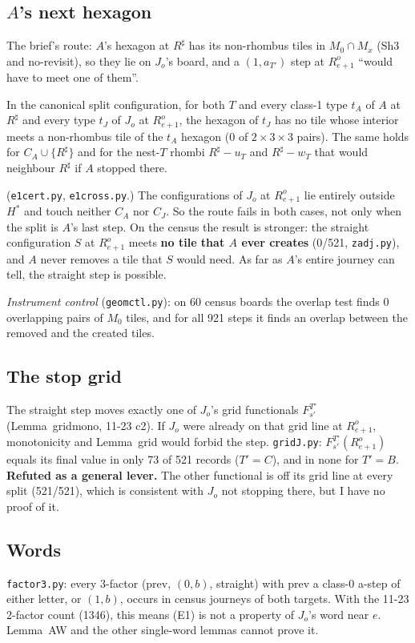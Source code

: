 \documentclass[11pt]{article}
\theoremstyle{definition}\newtheorem{definition}[theorem]{Definition}\newtheorem{remark}[theorem]{Remark}
\begin{document}
\subsection{$A$'s next hexagon}
The brief's route: $A$'s hexagon at $R^\sharp$ has its non-rhombus tiles in $M_0\cap M_x$ (Sh3 and no-revisit), so they lie on $J_o$'s board, and a $(1,a_{T'})$ step at $R^o_{e+1}$ ``would have to meet one of them''.
\begin{lemma}\label{lem:noA}
In the canonical split configuration, for both $T$ and every class-1 type $t_A$ of $A$ at $R^\sharp$ and every type $t_J$ of $J_o$ at $R^o_{e+1}$, the hexagon of $t_J$ has no tile whose interior meets a non-rhombus tile of the $t_A$ hexagon ($0$ of $2\times3\times3$ pairs). The same holds for $C_A\cup\{R^\sharp\}$ and for the nest-$T$ rhombi $R^\sharp-u_T$ and $R^\sharp-w_T$ that would neighbour $R^\sharp$ if $A$ stopped there.
\end{lemma}
\noindent (\texttt{e1cert.py}, \texttt{e1cross.py}.) The configurations of $J_o$ at $R^o_{e+1}$ lie entirely outside $H^\ast$ and touch neither $C_A$ nor $C_J$. So the route fails in both cases, not only when the split is $A$'s last step. On the census the result is stronger: the straight configuration $S$ at $R^o_{e+1}$ meets \textbf{no tile that $A$ ever creates} (0/521, \texttt{zadj.py}), and $A$ never removes a tile that $S$ would need. As far as $A$'s entire journey can tell, the straight step is possible.

\noindent\emph{Instrument control} (\texttt{geomctl.py}): on 60 census boards the overlap test finds 0 overlapping pairs of $M_0$ tiles, and for all 921 steps it finds an overlap between the removed and the created tiles.

\subsection{The stop grid}
The straight step moves exactly one of $J_o$'s grid functionals $F^{T'}_{s'}$ (Lemma~gridmono, 11-23 c2). If $J_o$ were already on that grid line at $R^o_{e+1}$, monotonicity and Lemma~grid would forbid the step. \texttt{gridJ.py}: $F^{T'}_{s'}(R^o_{e+1})$ equals its final value in only 73 of 521 records ($T'=C$), and in none for $T'=B$. \textbf{Refuted as a general lever.} The other functional is off its grid line at every split (521/521), which is consistent with $J_o$ not stopping there, but I have no proof of it.

\subsection{Words}
\texttt{factor3.py}: every 3-factor (prev, $(0,b)$, straight) with prev a class-0 a-step of either letter, or $(1,b)$, occurs in census journeys of both targets. With the 11-23 2-factor count (1346), this means (E1) is not a property of $J_o$'s word near $e$. Lemma~AW and the other single-word lemmas cannot prove it.
\end{document}
